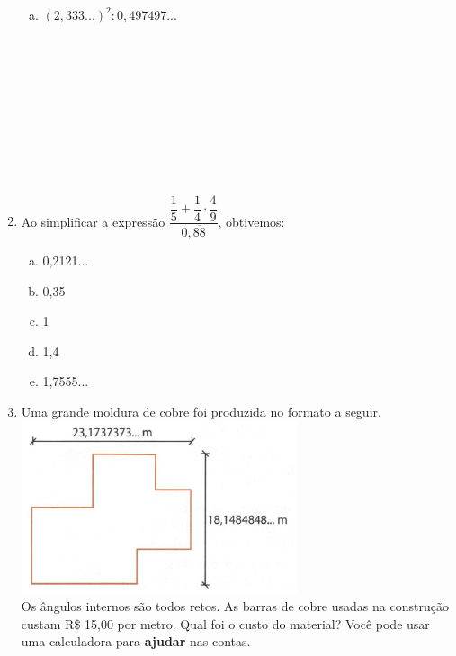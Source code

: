 \documentclass[a4paper,14pt]{article}
\begin{document}
\begin{multicols}{2}
\begin{enumerate}
\begin{enumerate}[a)]
				\item $(2,333...)^2 : 0,497497...$ \\\\\\\\\\\\\\\\\\\\
			\end{enumerate}
			\item Ao simplificar a expressão $\dfrac{\dfrac{1}{5} + \dfrac{1}{4} \cdot \dfrac{4}{9}}{0,\overline{88}}$, obtivemos:
			\begin{enumerate}[a)]
				\item 0,2121...
				\item 0,35
				\item 1
				\item 1,4
				\item 1,7555... \newpage
			\end{enumerate}
			\item Uma grande moldura de cobre foi produzida no formato a seguir. \\
			\includegraphics[width=1\linewidth]{6FMA154_imagens/imagem1} \\
			Os ângulos internos são todos retos. As barras de cobre usadas na construção custam R\$ 15,00 por metro. Qual foi o custo do material? Você pode usar uma calculadora para \textbf{ajudar} nas contas. \\\\\\\\\\\\\\\\\\\\

\end{enumerate}
\end{multicols}
\end{document}

